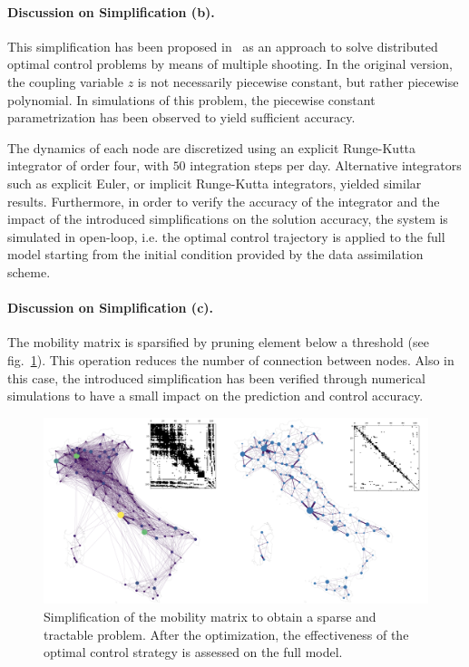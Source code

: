 \paragraph{Discussion on Simplification (b).}
This simplification has been proposed in~\cite{Savorgnan:MultipleShootingDistributed:2011} as an approach to solve distributed optimal control problems by means of multiple shooting. In the original version, the coupling variable $z$ is not necessarily piecewise constant, but rather piecewise polynomial. In simulations of this problem, the piecewise constant parametrization has been observed to yield sufficient accuracy.

The dynamics of each node are discretized using an explicit Runge-Kutta integrator of order four, with $50$ integration steps per day. Alternative integrators such as explicit Euler, or implicit Runge-Kutta integrators, yielded similar results. Furthermore, in order to verify the accuracy of the integrator and the impact of the introduced simplifications on the solution accuracy, the system is simulated in open-loop, i.e. the optimal control trajectory is applied to the full model starting from the initial condition provided by the data assimilation scheme.

\paragraph{Discussion on Simplification (c).} The mobility matrix is sparsified by pruning element below a threshold (see fig.~\ref{figSI:mobility_simplification}). This operation reduces the number of connection between nodes. Also in this case, the introduced simplification has been verified through numerical simulations to have a small impact on the prediction and control accuracy.

\begin{figure}
\centering
\includegraphics[width=\textwidth]{fig_italy-ocp/figuresSI/mobsimplification.png}
\caption[Simplification of the mobility matrix to obtain a sparse and tractable problem]{Simplification of the mobility matrix to obtain a sparse and tractable problem. After the optimization, the effectiveness of the optimal control strategy is assessed on the full model.} \label{figSI:mobility_simplification}
\end{figure}

